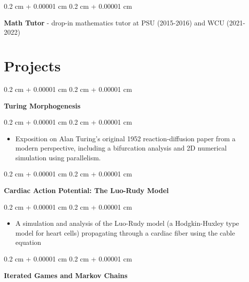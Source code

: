 \documentclass[10pt, letterpaper]{article}
\newenvironment{highlights}{
    \begin{itemize}[
        topsep=0.10 cm,
        parsep=0.10 cm,
        partopsep=0pt,
        itemsep=0pt,
        leftmargin=0.4 cm + 10pt
    ]
}{
    \end{itemize}
} %
\newenvironment{onecolentry}{
    \begin{adjustwidth}{
        0.2 cm + 0.00001 cm
    }{
        0.2 cm + 0.00001 cm
    }
}{
    \end{adjustwidth}
} %
\begin{document}
        \vspace{0.2 cm}

        \begin{onecolentry}
            \textbf{Math Tutor} - drop-in mathematics tutor at PSU (2015-2016) and WCU (2021-2022)
        \end{onecolentry}


    
    \section{Projects}



        
        \begin{onecolentry}
            \textbf{Turing Morphogenesis}
        \end{onecolentry}

        \vspace{0.10 cm}
        \begin{onecolentry}
            \begin{highlights}
                \item Exposition on Alan Turing's original 1952 reaction-diffusion paper from a modern perspective, including a bifurcation analysis and 2D numerical simulation using parallelism.
            \end{highlights}
        \end{onecolentry}


        \vspace{0.2 cm}

        \begin{onecolentry}
            \textbf{Cardiac Action Potential: The Luo-Rudy Model}
        \end{onecolentry}

        \vspace{0.10 cm}
        \begin{onecolentry}
            \begin{highlights}
                \item A simulation and analysis of the Luo-Rudy model (a Hodgkin-Huxley type model for heart cells) propagating through a cardiac fiber using the cable equation
            \end{highlights}
        \end{onecolentry}


        \vspace{0.2 cm}

        \begin{onecolentry}
            \textbf{Iterated Games and Markov Chains}
        \end{onecolentry}
\end{document}
